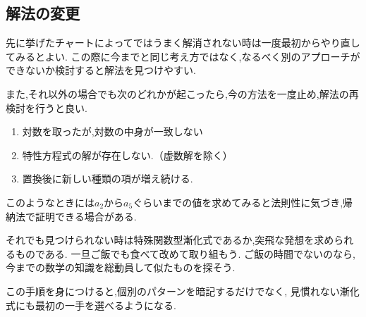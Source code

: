  \subsection{解法の変更}\label{節：解法の変更}

  先に挙げたチャートによってではうまく解消されない時は一度最初からやり直してみるとよい.   
  この際に今までと同じ考え方ではなく,なるべく別のアプローチができないか検討すると解法を見つけやすい.

  また,それ以外の場合でも次のどれかが起こったら,今の方法を一度止め,解法の再検討を行うと良い.
  \begin{enumerate}
    \item 対数を取ったが,対数の中身が一致しない
    \item 特性方程式の解が存在しない.（虚数解を除く）
    \item 置換後に新しい種類の項が増え続ける.
  \end{enumerate}
  このようなときには$a_2$から$a_5$ぐらいまでの値を求めてみると法則性に気づき,帰納法で証明できる場合がある.
  

  それでも見つけられない時は特殊関数型漸化式であるか,突飛な発想を求められるものである.
  一旦ご飯でも食べて改めて取り組もう.
  ご飯の時間でないのなら,今までの数学の知識を総動員して似たものを探そう.
  
  この手順を身につけると,個別のパターンを暗記するだけでなく,
  見慣れない漸化式にも最初の一手を選べるようになる.